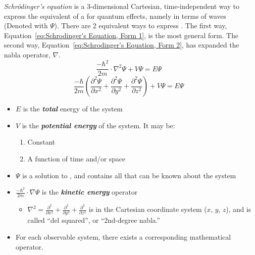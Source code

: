 		\begin{definition} \label{def:Schrodinger's Equation}
			\emph{Schr\"{o}dinger's equation} is a 3-dimensional Cartesian, time-independent way to express the equivalent of a  for quantum effects, namely in terms of waves (Denoted with $\Psi$).
			There are 2 equivalent ways to express .
			The first way, Equation~\eqref{eq:Schrodinger's Equation, Form 1}, is the most general form.
			The second way, Equation~\eqref{eq:Schrodinger's Equation, Form 2}, has expanded the nabla operator, $\nabla$.
			\begin{equation} \label{eq:Schrodinger's Equation, Form 1}
				\frac{- \hbar^{2}}{2m} \cdot \nabla^{2} \Psi + V\Psi = E\Psi
			\end{equation}
			\begin{equation} \label{eq:Schrodinger's Equation, Form 2}
				\frac{-\hbar}{2m} \left( \frac{\partial^{2} \Psi}{\partial x^{2}} + \frac{\partial^{2} \Psi}{\partial y^{2}} + \frac{\partial^{2} \Psi}{\partial z^{2}} \right) + V\Psi = E\Psi
			\end{equation}
			\begin{itemize}[noitemsep, nolistsep]
				\item $E$ is the \emph{\textbf{total}} energy of the system
				\item $V$ is the \emph{\textbf{potential energy}} of the system. It may be:
				\begin{enumerate}
					\item Constant
					\item A function of time and/or space
				\end{enumerate}
				\item $\Psi$ is a solution to , and contains all that can be known about the system
				\item $\frac{-\hbar^{2}}{2m} \cdot \nabla\Psi$ is the \emph{\textbf{kinetic energy}} operator
				\begin{itemize}[noitemsep, nolistsep]
					\item $\nabla^{2} = \frac{\partial^{2}}{\partial x^{2}} + \frac{\partial^{2}}{\partial y^{2}} + \frac{\partial^{2}}{\partial z^{2}}$ is in the Cartesian coordinate system ($x$, $y$, $z$), and is called ``del squared'', or ``2nd-degree nabla.''
				\end{itemize}
				\item For each observable system, there exists a corresponding mathematical operator.

\end{itemize}
\end{definition}
